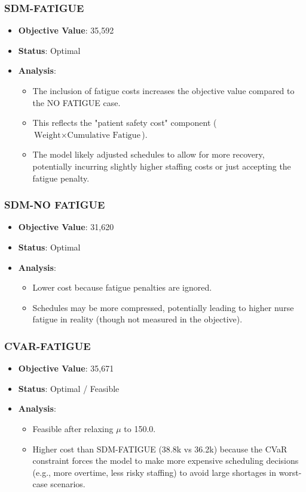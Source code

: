 \documentclass[10pt,a4paper,twocolumn]{article}
\begin{document}
\subsubsection{SDM-FATIGUE}
\begin{itemize}
    \item \textbf{Objective Value}: 35,592
    \item \textbf{Status}: Optimal
    \item \textbf{Analysis}:
    \begin{itemize}
        \item The inclusion of fatigue costs increases the objective value compared to the NO FATIGUE case.
        \item This reflects the "patient safety cost" component ($\text{Weight} \times \text{Cumulative Fatigue}$).
        \item The model likely adjusted schedules to allow for more recovery, potentially incurring slightly higher staffing costs or just accepting the fatigue penalty.
    \end{itemize}
\end{itemize}
\subsubsection{SDM-NO FATIGUE}
\begin{itemize}
    \item \textbf{Objective Value}: 31,620
    \item \textbf{Status}: Optimal
    \item \textbf{Analysis}:
    \begin{itemize}
        \item Lower cost because fatigue penalties are ignored.
        \item Schedules may be more compressed, potentially leading to higher nurse fatigue in reality (though not measured in the objective).
    \end{itemize}
\end{itemize}
\subsubsection{CVAR-FATIGUE}
\begin{itemize}
    \item \textbf{Objective Value}: 35,671
    \item \textbf{Status}: Optimal / Feasible
    \item \textbf{Analysis}:
    \begin{itemize}
        \item Feasible after relaxing $\mu$ to 150.0.
        \item Higher cost than SDM-FATIGUE (38.8k vs 36.2k) because the CVaR constraint forces the model to make more expensive scheduling decisions (e.g., more overtime, less risky staffing) to avoid large shortages in worst-case scenarios.
    \end{itemize}
\end{itemize}
\end{document}
